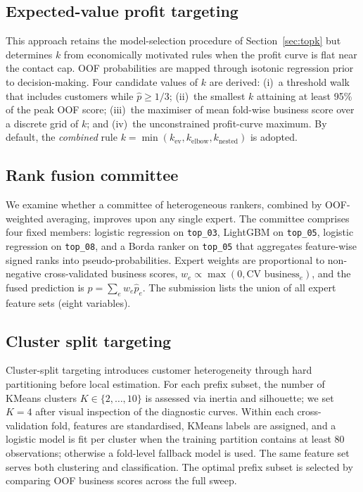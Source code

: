 \documentclass[cameraready]{Interspeech}
\begin{document}
\subsection{Expected-value profit targeting}
\label{sec:ev}

This approach retains the model-selection procedure of Section~\ref{sec:topk} but determines $k$ from economically motivated rules when the profit curve is flat near the contact cap.
OOF probabilities are mapped through isotonic regression prior to decision-making.
Four candidate values of $k$ are derived: (i)~a threshold walk that includes customers while $\hat{p} \geq 1/3$; (ii)~the smallest $k$ attaining at least 95\% of the peak OOF score; (iii)~the maximiser of mean fold-wise business score over a discrete grid of $k$; and (iv)~the unconstrained profit-curve maximum.
By default, the \emph{combined} rule $k = \min(k_{\mathrm{ev}}, k_{\mathrm{elbow}}, k_{\mathrm{nested}})$ is adopted.

\subsection{Rank fusion committee}
\label{sec:fusion}

We examine whether a committee of heterogeneous rankers, combined by OOF-weighted averaging, improves upon any single expert.
The committee comprises four fixed members: logistic regression on \texttt{top\_03}, LightGBM on \texttt{top\_05}, logistic regression on \texttt{top\_08}, and a Borda ranker on \texttt{top\_05} that aggregates feature-wise signed ranks into pseudo-probabilities.
Expert weights are proportional to non-negative cross-validated business scores, $w_e \propto \max(0, \text{CV business}_e)$, and the fused prediction is $\hat{p} = \sum_e w_e \hat{p}_e$.
The submission lists the union of all expert feature sets (eight variables).

\subsection{Cluster split targeting}
\label{sec:cluster}

Cluster-split targeting introduces customer heterogeneity through hard partitioning before local estimation.
For each prefix subset, the number of KMeans clusters $K \in \{2,\ldots,10\}$ is assessed via inertia and silhouette; we set $K{=}4$ after visual inspection of the diagnostic curves.
Within each cross-validation fold, features are standardised, KMeans labels are assigned, and a logistic model is fit per cluster when the training partition contains at least 80 observations; otherwise a fold-level fallback model is used.
The same feature set serves both clustering and classification.
The optimal prefix subset is selected by comparing OOF business scores across the full sweep.
\end{document}
